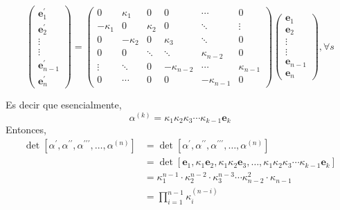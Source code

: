 \begin{problema}
\begin{sol}
        $$\left(\begin{array}{c}\mathbf{e}_1^{\prime} \\ \mathbf{e}_2^{\prime} \\ \vdots \\ \vdots \\ \mathbf{e}_{n-1}^{\prime} \\ \mathbf{e}_n^{\prime}\end{array}\right)=\left(\begin{array}{cccccc}0 & \kappa_1 & 0 & 0 & \cdots & 0 \\ -\kappa_1 & 0 & \kappa_2 & 0 & \ddots & \vdots \\ 0 & -\kappa_2 & 0 & \kappa_3 & \ddots & 0 \\ 0 & 0 & \ddots & \ddots & \kappa_{n-2} & 0 \\ \vdots & \ddots & 0 & -\kappa_{n-2} & \cdots & \kappa_{n-1} \\ 0 & \cdots & 0 & 0 & -\kappa_{n-1} & 0\end{array}\right)\left(\begin{array}{c}\mathbf{e}_1 \\ \mathbf{e}_2 \\ \vdots \\ \vdots \\ \mathbf{e}_{n-1} \\ \mathbf{e}_n\end{array}\right), \forall s$$

        Es decir que esencialmente, 
        $$\alpha^{(k)} =\kappa_1\kappa_2\kappa_3\cdots\kappa_{k-1}\mathbf{e}_k$$
        Entonces, 
        \begin{align*}
            \det \left[\alpha^{\prime}, \alpha^{\prime \prime}, \alpha^{\prime \prime \prime}, \ldots, \alpha^{(n)}\right]&=\det \left[\alpha^{\prime}, \alpha^{\prime \prime}, \alpha^{\prime \prime \prime}, \ldots, \alpha^{(n)}\right]\\
            &= \det \left[\mathbf{e}_1,\kappa_1\mathbf{e}_2, \kappa_1\kappa_2\mathbf{e}_3, \ldots, \kappa_1\kappa_2\kappa_3\cdots\kappa_{k-1}\mathbf{e}_k\right]\\
            &= \kappa_1^{n-1} \cdot \kappa_2^{n-2} \cdot \kappa_3^{n-3} \cdots \kappa_{n-2}^2 \cdot \kappa_{n-1}\\
            &=\prod_{i=1}^{n-1} \kappa_{i}^{(n-i)}
        \end{align*}
    \end{sol}


\end{problema}


